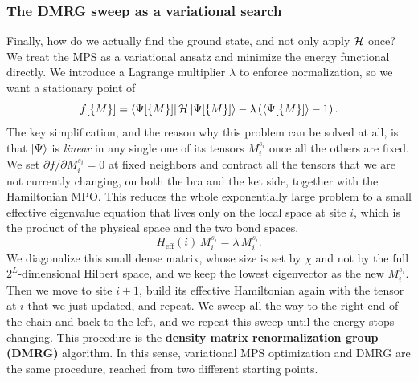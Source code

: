 \documentclass[lecture_notes.tex]{subfiles}
\begin{document}
\subsubsection{The DMRG sweep as a variational search}
Finally, how do we actually find the ground state, and not only apply $\mathcal{H}$ once? We treat the MPS
as a variational ansatz and minimize the energy functional directly. We introduce a Lagrange
multiplier $\lambda$ to enforce normalization, so we want a stationary point of
\begin{equation}
  f[\{M\}] = \bra{\Psi[\{M\}]}\mathcal{H}\ket{\Psi[\{M\}]} - \lambda\left(\braket{\Psi[\{M\}]}-1\right).
\end{equation}
The key simplification, and the reason why this problem can be solved at all, is that $\ket{\Psi}$
is \emph{linear} in any single one of its tensors $M_i^{s_i}$ once all the others are fixed. We set
$\partial f/\partial M_i^{s_i} = 0$ at fixed neighbors and contract all the tensors that we are not
currently changing, on both the bra and the ket side, together with the Hamiltonian MPO. This
reduces the whole exponentially large problem to a small effective eigenvalue equation that lives
only on the local space at site $i$, which is the product of the physical space and the two bond
spaces,
\begin{equation}
  H_{\mathrm{eff}}(i)\, M_i^{s_i} = \lambda\, M_i^{s_i}.
\end{equation}
We diagonalize this small dense matrix, whose size is set by $\chi$ and not by the full
$2^L$-dimensional Hilbert space, and we keep the lowest eigenvector as the new $M_i^{s_i}$. Then we
move to site $i+1$, build its effective Hamiltonian again with the tensor at $i$ that we just
updated, and repeat. We sweep all the way to the right end of the chain and back to the left, and
we repeat this sweep until the energy stops changing. This procedure is the \textbf{density matrix renormalization group (DMRG)} algorithm. In this sense, variational MPS
optimization and DMRG are the same procedure, reached from two different starting points.
\end{document}
